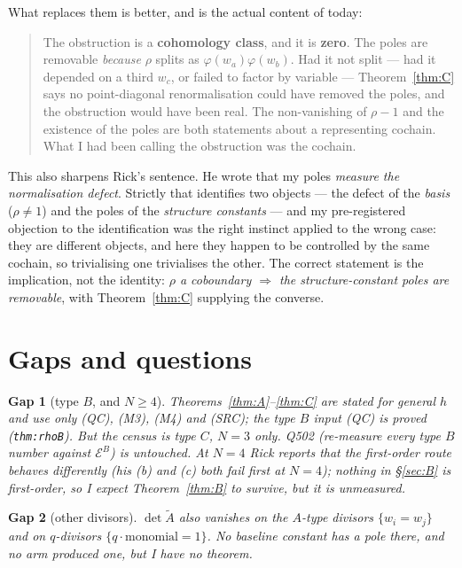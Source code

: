 \documentclass[11pt]{article}
\theoremstyle{plain}
\theoremstyle{definition}
\theoremstyle{remark}
\theoremstyle{plain}
\newtheorem{gapthm}{Gap}
\newcommand{\At}{\widetilde{A}}
\begin{document}
\noindent
What replaces them is better, and is the actual content of today:

\begin{quote}
The obstruction is a \textbf{cohomology class}, and it is \textbf{zero}.  The
poles are removable \emph{because} $\rho$ splits as $\varphi(w_a)\varphi(w_b)$.
Had it not split --- had it depended on a third $w_c$, or failed to factor by
variable --- Theorem~\ref{thm:C} says no point-diagonal renormalisation could
have removed the poles, and the obstruction would have been real.  The
non-vanishing of $\rho-1$ and the existence of the poles are both statements
about a representing cochain.  What I had been calling the obstruction was the
cochain.
\end{quote}

\noindent
This also sharpens Rick's sentence.  He wrote that my poles \emph{measure the
normalisation defect}.  Strictly that identifies two objects --- the defect of
the \emph{basis} ($\rho\ne1$) and the poles of the \emph{structure constants} ---
and my pre-registered objection to the identification was the right instinct
applied to the wrong case: they are different objects, and here they happen to be
controlled by the same cochain, so trivialising one trivialises the other.  The
correct statement is the implication, not the identity: \emph{$\rho$ a coboundary
$\Rightarrow$ the structure-constant poles are removable}, with Theorem~\ref{thm:C}
supplying the converse.

\section{Gaps and questions}

\begin{gapthm}[type $B$, and $N\ge4$]
Theorems~\ref{thm:A}--\ref{thm:C} are stated for general $h$ and use only (QC),
(M3), (M4) and (SRC); the type $B$ input (QC) is proved
(\texttt{thm:rhoB}).  But the \emph{census} is type $C$, $N=3$ only.  Q502 (re-measure
every type $B$ number against $\mathcal{E}^B$) is untouched.  At $N=4$ Rick
reports that the first-order route behaves differently (his (b) and (c) both fail
first at $N=4$); nothing in \S\ref{sec:B} is first-order, so I expect
Theorem~\ref{thm:B} to survive, but it is unmeasured.
\end{gapthm}

\begin{gapthm}[other divisors]
$\det\At$ also vanishes on the $A$-type divisors $\{w_i=w_j\}$ and on
$q$-divisors $\{q\cdot\text{monomial}=1\}$.  No baseline constant has a pole
there, and no arm produced one, but I have no theorem.
\end{gapthm}
\end{document}
